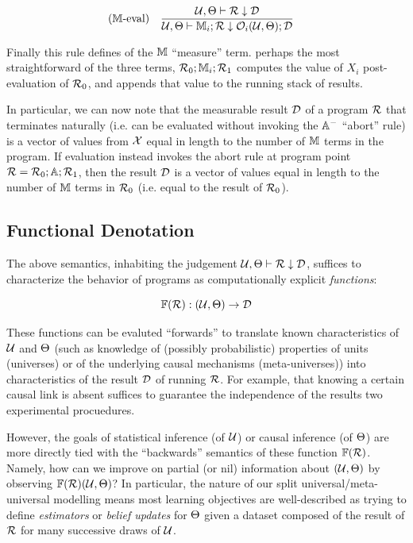 \documentclass{article}
\begin{document}
\begin{align*}
  (\mathbb{M}\text{-eval}) &\quad \frac{\mathcal{U}, \Theta \vdash \mathcal{R} \downarrow \mathcal{D}}{\mathcal{U}, \Theta \vdash \mathbb{M}_{i}; \mathcal{R} \downarrow \mathcal{O}_i(\mathcal{U}, \Theta); \mathcal{D}}
\end{align*}

Finally this rule defines of the $\mathbb{M}$ ``measure'' term. perhaps the most straightforward of the three \AIM terms, $\mathcal{R}_0; \mathbb{M}_i; \mathcal{R}_1$ computes the value of $X_i$ post-evaluation of $\mathcal{R}_0$, and appends that value to the running stack of results.

In particular, we can now note that the measurable result $\mathcal{D}$ of a program $\mathcal{R}$ that terminates naturally (i.e. can be evaluated without invoking the $\mathbb{A}^-$ ``abort'' rule) is a vector of values from $\mathcal{X}$ equal in length to the number of $\mathbb{M}$ terms in the program. If evaluation instead invokes the abort rule at program point $\mathcal{R} = \mathcal{R}_0; \mathbb{A}; \mathcal{R}_1$, then the result $\mathcal{D}$ is a vector of values equal in length to the number of $\mathbb{M}$ terms in $\mathcal{R}_0$ (i.e. equal to the result of $\mathcal{R}_0$).

\subsection{Functional Denotation}

\newcommand{\F}{\mathbb{F}}

The above semantics, inhabiting the judgement $\mathcal{U}, \Theta \vdash \mathcal{R} \downarrow \mathcal{D}$, suffices to characterize the behavior of \AIM programs as computationally explicit \textit{functions}:

\begin{equation*}
\F(\R) : (\U, \MU) \to \D
\end{equation*}

These functions can be evaluted ``forwards'' to translate known characteristics of $\mathcal{U}$ and $\Theta$ (such as knowledge of (possibly probabilistic) properties of units (universes) or of the underlying causal mechanisms (meta-universes)) into characteristics of the result $\mathcal{D}$ of running $\mathcal{R}$. For example, that knowing a certain causal link is absent suffices to guarantee the independence of the results two experimental procuedures.

However, the goals of statistical inference (of $\mathcal{U}$) or causal inference (of $\Theta$) are more directly tied with the ``backwards'' semantics of these function $\F(\R)$. Namely, how can we improve on partial (or nil) information about $(\mathcal{U}, \Theta)$ by observing $\F(\R)(\U, \MU)$? In particular, the nature of our split universal/meta-universal modelling means most learning objectives are well-described as trying to define \textit{estimators} or \textit{belief updates} for $\Theta$ given a dataset composed of the result of $\mathcal{R}$ for many successive draws of $\mathcal{U}$.
\end{document}
